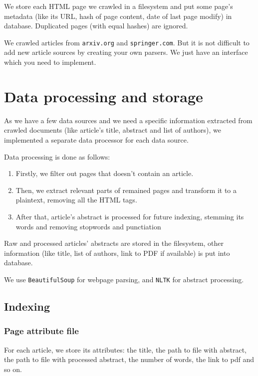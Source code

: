 We store each HTML page we crawled in a filesystem and put some page's metadata 
(like its URL, hash of page content, date of last page modify) in database. Duplicated pages (with equal hashes) are ignored.

We crawled articles from \texttt{arxiv.org} and \texttt{springer.com}. But it is not difficult to add new article sources by creating your own parsers. We just have an interface which you need to implement.

\section{Data processing and storage}

As we have a few data sources and we need a specific information extracted from crawled documents
(like article's title, abstract and list of authors), we implemented a separate data processor for each data source.

Data processing is done as follows:
\begin{enumerate}

\item Firstly, we filter out pages that doesn't contain an article.

\item Then, we extract relevant parts of remained pages and transform it to a plaintext, removing all the HTML tags.

\item After that, article's abstract is processed for future indexing, stemming its words and removing stopwords and punctiation

\end{enumerate}

Raw and processed articles' abstracts are stored in the filesystem,
other information (like title, list of authors, link to PDF if available) is put into database.

We use \texttt{BeautifulSoup} for webpage parsing, and \texttt{NLTK} for abstract processing.

\subsection{Indexing}
\subsubsection{Page attribute file}
For each article, we store its attributes: the title, the path to file with abstract, the path to file with processed abstract, the number of words, the link to pdf and so on.

